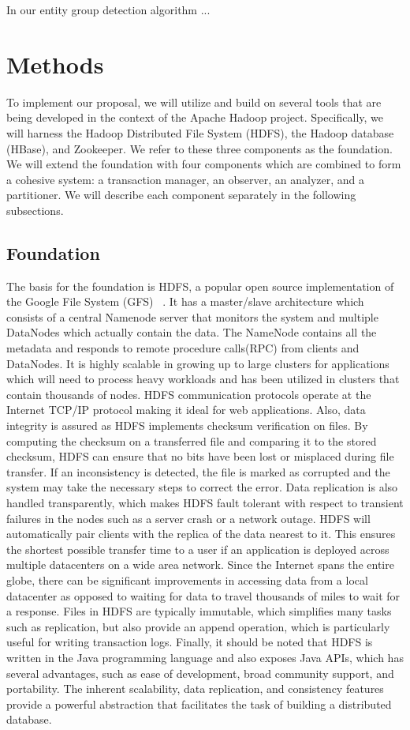 \documentclass[10pt,final,journal]{IEEEtran}
\begin{document}
In our entity group detection algorithm ...


\section{Methods}
To implement our proposal, we will utilize and build on several tools that are being developed in the context of the Apache Hadoop project. Specifically, we will harness the Hadoop Distributed File System (HDFS), the Hadoop database (HBase), and Zookeeper. We refer to these three components as the foundation. We will extend the foundation with four components which are combined to form a cohesive system: a transaction manager, an observer, an analyzer, and a partitioner. We will describe each component separately in the following subsections.

\subsection{Foundation}
The basis for the foundation is HDFS, a popular open source implementation of the Google File System (GFS) ~\cite{Ghemawat:2003:GFS:1165389.945450}. It has a master/slave architecture which consists of a central Namenode server that monitors the system and multiple DataNodes which actually contain the data. The NameNode contains all the metadata and responds to remote procedure calls(RPC) from clients and DataNodes. It is highly scalable in growing up to large clusters for applications which will need to process heavy workloads and has been utilized in clusters that contain thousands of nodes.  HDFS communication protocols operate at the Internet TCP/IP protocol making it ideal for web applications. Also, data integrity is assured as HDFS implements checksum verification on files. By computing the checksum on a transferred file and comparing it to the stored checksum, HDFS can ensure that no bits have been lost or misplaced during file transfer. If an inconsistency is detected, the file is marked as corrupted and the system may take the necessary steps to correct the error.  Data replication is also handled transparently, which makes HDFS fault tolerant with respect to transient failures in the nodes such as a server crash or a network outage. HDFS will automatically pair clients with the replica of the data nearest to it. This ensures the shortest possible transfer time to a user if an application is deployed across multiple datacenters on a wide area network. Since the Internet spans the entire globe, there can be significant improvements in accessing data from a local datacenter as opposed to waiting for data to travel thousands of miles to wait for a response. Files in HDFS are typically immutable, which simplifies many tasks such as replication, but also provide an append operation, which is particularly useful for writing transaction logs. Finally, it should be noted that HDFS is written in the Java programming language and also exposes Java APIs, which has several advantages, such as ease of development, broad community support, and portability. The inherent scalability, data replication, and consistency features provide a powerful abstraction that facilitates the task of building a distributed database.
\end{document}
